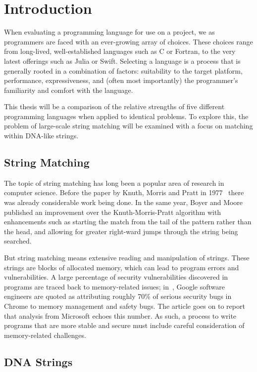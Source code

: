 \section{Introduction}
\label{sec:introduction}

When evaluating a programming language for use on a project, we as programmers are faced with an ever-growing array of choices. These choices range from long-lived, well-established languages such as C or Fortran, to the very latest offerings such as Julia or Swift. Selecting a language is a process that is generally rooted in a combination of factors: suitability to the target platform, performance, expressiveness, and (often most importantly) the programmer's familiarity and comfort with the language.

This thesis will be a comparison of the relative strengths of five different programming languages when applied to identical problems. To explore this, the problem of large-scale string matching will be examined with a focus on matching within DNA-like strings.

\subsection{String Matching}

The topic of string matching has long been a popular area of research in computer science. Before the paper by Knuth, Morris and Pratt in 1977~\cite{knuth.morris.pratt.1977} there was already considerable work being done. In the same year, Boyer and Moore~\cite{boyer.moore.1977} published an improvement over the Knuth-Morris-Pratt algorithm with enhancements such as starting the match from the tail of the pattern rather than the head, and allowing for greater right-ward jumps through the string being searched.

But string matching means extensive reading and manipulation of strings. These strings are blocks of allocated memory, which can lead to program errors and vulnerabilities. A large percentage of security vulnerabilities discovered in programs are traced back to memory-related issues; in~\cite{cimpanu.2020}, Google software engineers are quoted as attributing roughly 70\% of serious security bugs in Chrome to memory management and safety bugs. The article goes on to report that analysis from Microsoft echoes this number. As such, a process to write programs that are more stable and secure must include careful consideration of memory-related challenges.

\subsection{DNA Strings}

